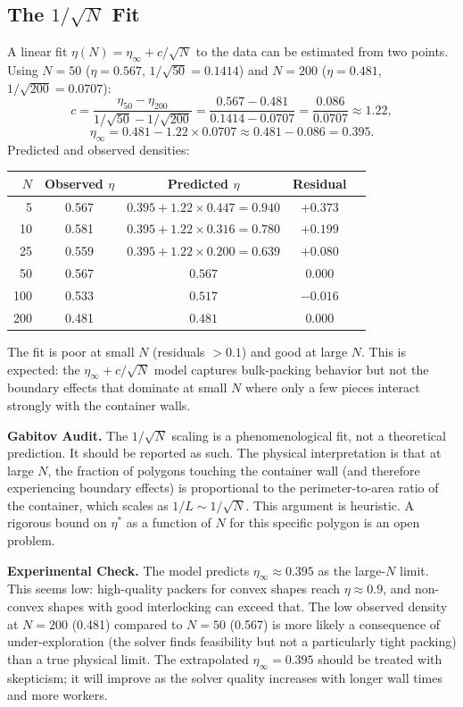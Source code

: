 \documentclass[11pt,oneside]{article}
\newcommand{\gabitov}[1]{\begin{gabitovbox}\textbf{Gabitov Audit.} #1\end{gabitovbox}}
\newcommand{\expcheck}[1]{\begin{resultbox}\textbf{Experimental Check.} #1\end{resultbox}}
\begin{document}
\subsection{The $1/\sqrt{N}$ Fit}

A linear fit $\eta(N) = \eta_\infty + c/\sqrt{N}$ to the data
can be estimated from two points. Using $N = 50$ ($\eta = 0.567$,
$1/\sqrt{50} = 0.1414$) and $N = 200$ ($\eta = 0.481$,
$1/\sqrt{200} = 0.0707$):
\[
  c = \frac{\eta_{50} - \eta_{200}}{1/\sqrt{50} - 1/\sqrt{200}}
  = \frac{0.567 - 0.481}{0.1414 - 0.0707}
  = \frac{0.086}{0.0707} \approx 1.22,
\]
\[
  \eta_\infty = 0.481 - 1.22 \times 0.0707 \approx 0.481 - 0.086 = 0.395.
\]
Predicted and observed densities:
\begin{center}
\begin{tabular}{rcccc}
\toprule
$N$ & Observed $\eta$ & Predicted $\eta$ & Residual \\
\midrule
  5 & 0.567 & $0.395 + 1.22 \times 0.447 = 0.940$ & $+0.373$ \\
 10 & 0.581 & $0.395 + 1.22 \times 0.316 = 0.780$ & $+0.199$ \\
 25 & 0.559 & $0.395 + 1.22 \times 0.200 = 0.639$ & $+0.080$ \\
 50 & 0.567 & $0.567$ & $0.000$ \\
100 & 0.533 & $0.517$ & $-0.016$ \\
200 & 0.481 & $0.481$ & $0.000$ \\
\bottomrule
\end{tabular}
\end{center}

The fit is poor at small $N$ (residuals $> 0.1$) and good at large
$N$. This is expected: the $\eta_\infty + c/\sqrt{N}$ model captures
bulk-packing behavior but not the boundary effects that dominate at
small $N$ where only a few pieces interact strongly with the container
walls.

\gabitov{%
The $1/\sqrt{N}$ scaling is a phenomenological fit, not a theoretical
prediction. It should be reported as such. The physical interpretation
is that at large $N$, the fraction of polygons touching the container
wall (and therefore experiencing boundary effects) is proportional to
the perimeter-to-area ratio of the container, which scales as
$1/L \sim 1/\sqrt{N}$. This argument is heuristic. A rigorous bound
on $\eta^*$ as a function of $N$ for this specific polygon is an open
problem.%
}

\expcheck{%
The model predicts $\eta_\infty \approx 0.395$ as the large-$N$ limit.
This seems low: high-quality packers for convex shapes reach $\eta
\approx 0.9$, and non-convex shapes with good interlocking can exceed
that. The low observed density at $N = 200$ (0.481) compared to $N = 50$
(0.567) is more likely a consequence of under-exploration (the solver
finds feasibility but not a particularly tight packing) than a true
physical limit. The extrapolated $\eta_\infty = 0.395$ should be
treated with skepticism; it will improve as the solver quality increases
with longer wall times and more workers.%
}
\end{document}
